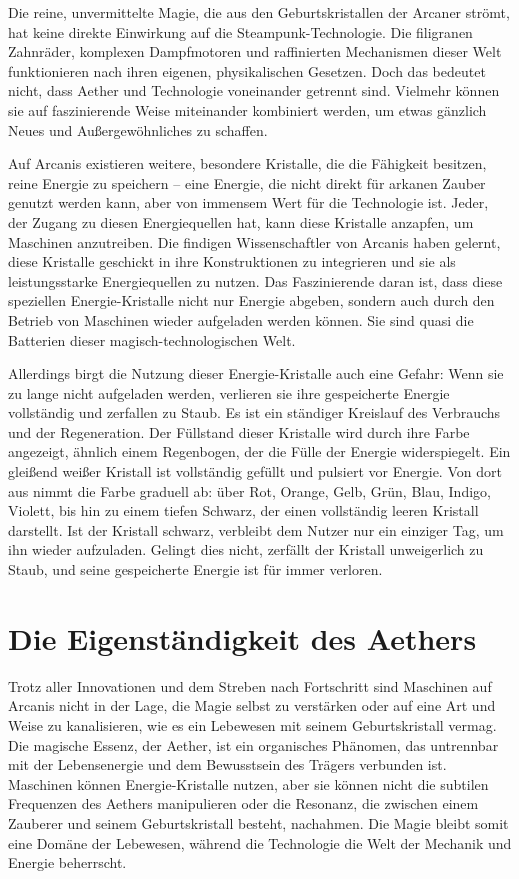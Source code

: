 \documentclass[10pt,a4paper,twocolumn,openany]{book}
\begin{document}
Die reine, unvermittelte Magie, die aus den Geburtskristallen der Arcaner strömt, hat keine direkte Einwirkung auf die Steampunk-Technologie. Die filigranen Zahnräder, komplexen Dampfmotoren und raffinierten Mechanismen dieser Welt funktionieren nach ihren eigenen, physikalischen Gesetzen. Doch das bedeutet nicht, dass Aether und Technologie voneinander getrennt sind. Vielmehr können sie auf faszinierende Weise miteinander kombiniert werden, um etwas gänzlich Neues und Außergewöhnliches zu schaffen.

Auf Arcanis existieren weitere, besondere Kristalle, die die Fähigkeit besitzen, reine Energie zu speichern – eine Energie, die nicht direkt für arkanen Zauber genutzt werden kann, aber von immensem Wert für die Technologie ist. Jeder, der Zugang zu diesen Energiequellen hat, kann diese Kristalle anzapfen, um Maschinen anzutreiben. Die findigen Wissenschaftler von Arcanis haben gelernt, diese Kristalle geschickt in ihre Konstruktionen zu integrieren und sie als leistungsstarke Energiequellen zu nutzen. Das Faszinierende daran ist, dass diese speziellen Energie-Kristalle nicht nur Energie abgeben, sondern auch durch den Betrieb von Maschinen wieder aufgeladen werden können. Sie sind quasi die Batterien dieser magisch-technologischen Welt.

Allerdings birgt die Nutzung dieser Energie-Kristalle auch eine Gefahr: Wenn sie zu lange nicht aufgeladen werden, verlieren sie ihre gespeicherte Energie vollständig und zerfallen zu Staub. Es ist ein ständiger Kreislauf des Verbrauchs und der Regeneration. Der Füllstand dieser Kristalle wird durch ihre Farbe angezeigt, ähnlich einem Regenbogen, der die Fülle der Energie widerspiegelt. Ein gleißend weißer Kristall ist vollständig gefüllt und pulsiert vor Energie. Von dort aus nimmt die Farbe graduell ab: über Rot, Orange, Gelb, Grün, Blau, Indigo, Violett, bis hin zu einem tiefen Schwarz, der einen vollständig leeren Kristall darstellt. Ist der Kristall schwarz, verbleibt dem Nutzer nur ein einziger Tag, um ihn wieder aufzuladen. Gelingt dies nicht, zerfällt der Kristall unweigerlich zu Staub, und seine gespeicherte Energie ist für immer verloren.

\section{Die Eigenständigkeit des Aethers}

Trotz aller Innovationen und dem Streben nach Fortschritt sind Maschinen auf Arcanis nicht in der Lage, die Magie selbst zu verstärken oder auf eine Art und Weise zu kanalisieren, wie es ein Lebewesen mit seinem Geburtskristall vermag. Die magische Essenz, der Aether, ist ein organisches Phänomen, das untrennbar mit der Lebensenergie und dem Bewusstsein des Trägers verbunden ist. Maschinen können Energie-Kristalle nutzen, aber sie können nicht die subtilen Frequenzen des Aethers manipulieren oder die Resonanz, die zwischen einem Zauberer und seinem Geburtskristall besteht, nachahmen. Die Magie bleibt somit eine Domäne der Lebewesen, während die Technologie die Welt der Mechanik und Energie beherrscht.
\end{document}
